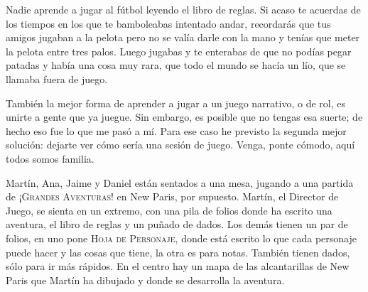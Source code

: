 
Nadie aprende a jugar al fútbol leyendo el libro de reglas. Si acaso te acuerdas de los tiempos en los que te bamboleabas intentado andar, recordarás que tus amigos jugaban a la pelota pero no se valía darle con la mano y tenías que meter la pelota entre tres palos. Luego jugabas y te enterabas de que no podías pegar patadas y había una cosa muy rara, que todo el mundo se hacía un lío, que se llamaba fuera de juego.

También la mejor forma de aprender a jugar a un juego narrativo, o de rol, es unirte a gente que ya juegue. Sin embargo, es posible que no tengas esa suerte; de hecho eso fue lo que me pasó a mí. Para ese caso he previsto la segunda mejor solución: dejarte ver cómo sería una sesión de juego. Venga, ponte cómodo, aquí todos somos familia.

Martín, Ana, Jaime y Daniel están sentados a una mesa, jugando a una partida de \textsc{¡Grandes Aventuras!} en New Paris, por supuesto. Martín, el Director de Juego, se sienta en un extremo, con una pila de folios donde ha escrito una aventura, el libro de reglas y un puñado de dados. Los demás tienen un par de folios, en uno pone \textsc{Hoja de Personaje}, donde está escrito lo que cada personaje puede hacer y las cosas que tiene, la otra es para notas. También tienen dados, sólo para ir más rápidos. En el centro hay un mapa de las alcantarillas de New Paris que Martín ha dibujado y donde se desarrolla la aventura.

